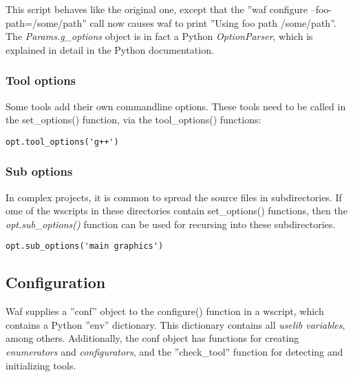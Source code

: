 \documentclass[a4,10pt]{article}
\begin{document}
This script behaves like the original one, except that the ''waf configure --foo-path=/some/path'' call now causes waf to print ''Using foo path /some/path''.\\
The \emph{Params.g\_options} object is in fact a Python \emph{OptionParser}, which is explained in detail in the Python documentation.

\subsubsection{Tool options}
Some tools add their own commandline options. These tools need to be called in the set\_options() function, via the tool\_options() functions:

\begin{center}
	\begin{lstlisting}[caption=\footnotesize Adding command-line options of the tool 'g++']
	opt.tool_options('g++')
	\end{lstlisting}
\end{center}

\subsubsection{Sub options}
In complex projects, it is common to spread the source files in subdirectories. If ome of the wscripts in these directories contain set\_options() functions, then the \emph{opt.sub\_options()} function can be used for recursing into these subdirectories.

\begin{center}
	\begin{lstlisting}[caption=\footnotesize Calling the set\_options() functions of the wscripts in the directories 'main' and 'graphics']
	opt.sub_options('main graphics')
	\end{lstlisting}
\end{center}

\subsection{Configuration}
Waf supplies a ''conf'' object to the configure() function in a wscript, which contains a Python ''env'' dictionary. This dictionary contains all \emph{uselib variables}, among others. Additionally, the conf object has functions for creating  \emph{enumerators} and \emph{configurators}, and the ''check\_tool'' function for detecting and initializing tools.
\end{document}
